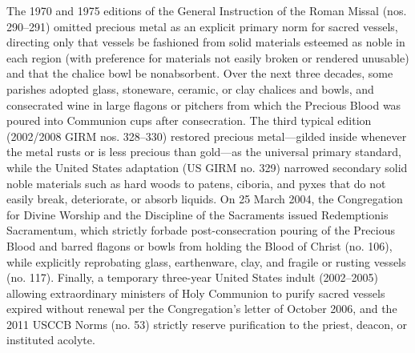 \label{pc-obj-hist-fragile-vessels-pouring}
The 1970 and 1975 editions of the General Instruction of the Roman Missal (nos. 290--291) omitted precious metal as an explicit primary norm for sacred vessels, directing only that vessels be fashioned from solid materials esteemed as noble in each region (with preference for materials not easily broken or rendered unusable) and that the chalice bowl be nonabsorbent. Over the next three decades, some parishes adopted glass, stoneware, ceramic, or clay chalices and bowls, and consecrated wine in large flagons or pitchers from which the Precious Blood was poured into Communion cups after consecration. The third typical edition (2002/2008 GIRM nos. 328--330) restored precious metal---gilded inside whenever the metal rusts or is less precious than gold---as the universal primary standard, while the United States adaptation (US GIRM no. 329) narrowed secondary solid noble materials such as hard woods to patens, ciboria, and pyxes that do not easily break, deteriorate, or absorb liquids. On 25 March 2004, the Congregation for Divine Worship and the Discipline of the Sacraments issued Redemptionis Sacramentum, which strictly forbade post-consecration pouring of the Precious Blood and barred flagons or bowls from holding the Blood of Christ (no. 106), while explicitly reprobating glass, earthenware, clay, and fragile or rusting vessels (no. 117). Finally, a temporary three-year United States indult (2002--2005) allowing extraordinary ministers of Holy Communion to purify sacred vessels expired without renewal per the Congregation's letter of October 2006, and the 2011 USCCB Norms (no. 53) strictly reserve purification to the priest, deacon, or instituted acolyte.


